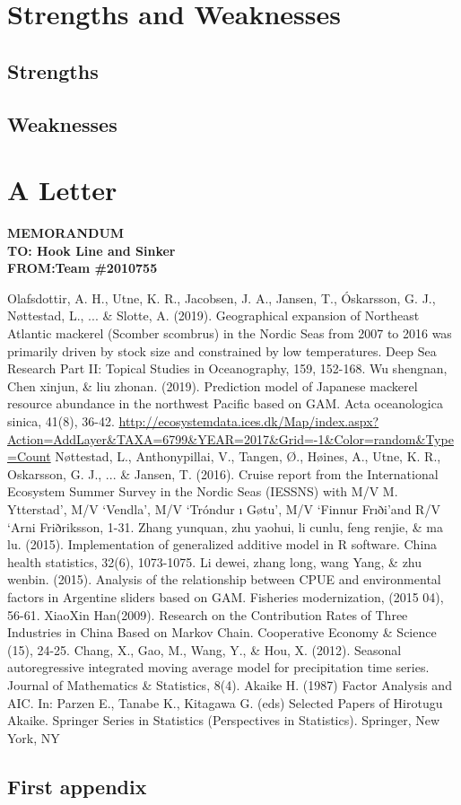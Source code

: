 \documentclass{mcmthesis}
\begin{document}
\section{Strengths and Weaknesses}
\subsection{Strengths}



\subsection{Weaknesses}


\section{A Letter}
\textbf{MEMORANDUM}~\\
\textbf{TO: Hook Line and Sinker}\\
\textbf{FROM:Team \#2010755}\\


\begin{thebibliography}{99}
 Olafsdottir, A. H., Utne, K. R., Jacobsen, J. A., Jansen, T., Óskarsson, G. J., Nøttestad, L., ... \& Slotte, A. (2019). Geographical expansion of Northeast Atlantic mackerel (Scomber scombrus) in the Nordic Seas from 2007 to 2016 was primarily driven by stock size and constrained by low temperatures. Deep Sea Research Part II: Topical Studies in Oceanography, 159, 152-168.
  Wu shengnan, Chen xinjun, \& liu zhonan. (2019). Prediction model of Japanese mackerel resource abundance in the northwest Pacific based on GAM. Acta oceanologica sinica, 41(8), 36-42.
\url{http://ecosystemdata.ices.dk/Map/index.aspx?Action=AddLayer&TAXA=6799&YEAR=2017&Grid=-1&Color=random&Type=Count}
 Nøttestad, L., Anthonypillai, V., Tangen, Ø., Høines, A., Utne, K. R., Oskarsson, G. J., ... \& Jansen, T. (2016). Cruise report from the International Ecosystem Summer Survey in the Nordic Seas (IESSNS) with M/V M. Ytterstad’, M/V ‘Vendla’, M/V ‘Tróndur ı Gøtu’, M/V ‘Finnur Frıði’and R/V ‘Arni Friðriksson, 1-31.
 Zhang yunquan, zhu yaohui, li cunlu, feng renjie, \& ma lu. (2015). Implementation of generalized additive model in R software. China health statistics, 32(6), 1073-1075.
Li dewei, zhang long, wang Yang, \& zhu wenbin. (2015). Analysis of the relationship between CPUE and environmental factors in Argentine sliders based on GAM. Fisheries modernization, (2015 04), 56-61.
XiaoXin Han(2009). Research on the Contribution Rates of Three Industries in
China Based on Markov Chain. Cooperative Economy \& Science (15), 24-25.
Chang, X., Gao, M., Wang, Y., \& Hou, X. (2012). Seasonal autoregressive integrated moving average model for precipitation time series. Journal of Mathematics \& Statistics, 8(4).
Akaike H. (1987) Factor Analysis and AIC. In: Parzen E., Tanabe K., Kitagawa G. (eds) Selected Papers of Hirotugu Akaike. Springer Series in Statistics (Perspectives in Statistics). Springer, New York, NY
\end{thebibliography}

\begin{appendices}

\section{First appendix}

\end{appendices}
\end{document}
